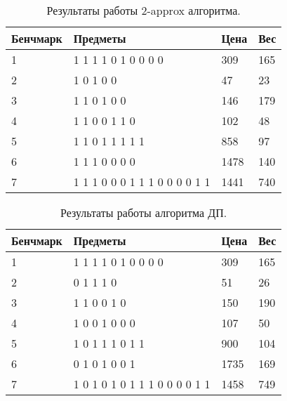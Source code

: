 \documentclass{article}
\begin{document}
\begin{table}[!h]
    \begin{center}
        \begin{tabular}{ | m{4.1em} | m{15em} | m{4.5em} | m{4.5em} |}
            \hline
            Бенчмарк & Предметы                      & Цена & Вес \\
            \hline
            1        & 1 1 1 1 0 1 0 0 0 0           & 309  & 165 \\
            \hline
            2        & 1 0 1 0 0                     & 47   & 23  \\
            \hline
            3        & 1 1 0 1 0 0                   & 146  & 179 \\
            \hline
            4        & 1 1 0 0 1 1 0                 & 102  & 48  \\
            \hline
            5        & 1 1 0 1 1 1 1 1               & 858  & 97  \\
            \hline
            6        & 1 1 1 0 0 0 0                 & 1478 & 140 \\
            \hline
            7        & 1 1 1 0 0 0 1 1 1 0 0 0 0 1 1 & 1441 & 740 \\
            \hline
        \end{tabular}
        \caption{Результаты работы 2-approx алгоритма.}
    \end{center}
\end{table}

\begin{table}[!h]
    \begin{center}
        \begin{tabular}{ | m{4.1em} | m{15em} | m{4.5em} | m{4.5em} |}
            \hline
            Бенчмарк & Предметы                      & Цена & Вес \\
            \hline
            1        & 1 1 1 1 0 1 0 0 0 0           & 309  & 165 \\
            \hline
            2        & 0 1 1 1 0                     & 51   & 26  \\
            \hline
            3        & 1 1 0 0 1 0                   & 150  & 190 \\
            \hline
            4        & 1 0 0 1 0 0 0                 & 107  & 50  \\
            \hline
            5        & 1 0 1 1 1 0 1 1               & 900  & 104 \\
            \hline
            6        & 0 1 0 1 0 0 1                 & 1735 & 169 \\
            \hline
            7        & 1 0 1 0 1 0 1 1 1 0 0 0 0 1 1 & 1458 & 749 \\
            \hline
        \end{tabular}
        \caption{Результаты работы алгоритма ДП.}
    \end{center}
\end{table}
\end{document}
